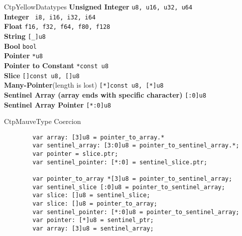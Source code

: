 \documentclass[10pt,a4paper]{article}
\begin{document}
\begin{multicols*}{3}
\begin{mycolorbox}{CtpYellow}{Datatypes}
			\textbf{Unsigned Integer} \texttt{u8, u16, u32, u64}\\
			\textbf{Integer} \texttt{ i8, i16, i32, i64}\\
			\textbf{Float} \texttt{f16, f32, f64, f80, f128}\\
			\textbf{String} \texttt{[_]u8}\\
			\textbf{Bool} \texttt{bool}\\
			\textbf{Pointer} \texttt{*u8}\\
			\textbf{Pointer to Constant} \texttt{*const u8} \\
			\textbf{Slice} \texttt{[]const u8, []u8}\\
			\textbf{Many-Pointer}(length is lost) \texttt{[*]const u8, [*]u8}\\
			\textbf{Sentinel Array (array ends with specific character)} \texttt{[:0]u8}\\
			\textbf{Sentinel Array Pointer} \texttt{[*:0]u8}\\
\end{mycolorbox}


\begin{mycolorbox}{CtpMauve}{Type Coercion}
	\begin{verbatim}
		var array: [3]u8 = pointer_to_array.*
		var sentinel_array: [3:0]u8 = pointer_to_sentinel_array.*;
		var pointer = slice.ptr;
		var sentinel_pointer: [*:0] = sentinel_slice.ptr;
		
		var pointer_to_array *[3]u8 = pointer_to_sentinel_array;
		var sentinel_slice [:0]u8 = pointer_to_sentinel_array;
		var slice: []u8 = sentinel_slice;
		var slice: []u8 = pointer_to_array;
		var sentinel_pointer: [*:0]u8 = pointer_to_sentinel_array;
		var pointer: [*]u8 = sentinel_ptr;
		var array: [3]u8 = sentinel_array;
		

\end{verbatim}
\end{mycolorbox}
\end{multicols*}
\end{document}
